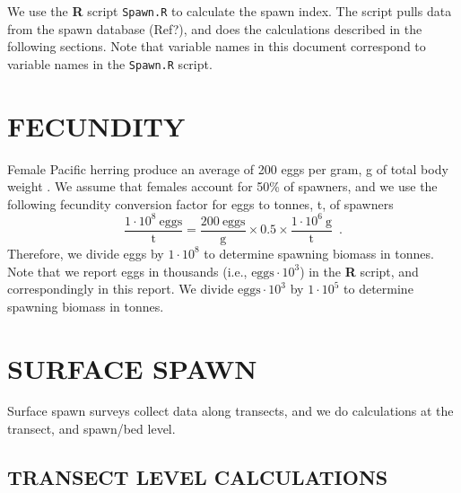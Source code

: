 \documentclass[12pt]{article}
\begin{document}
We use the \textbf{R} \citeyearpar[RCT][]{R-3.3.2} script \texttt{Spawn.R} to calculate the spawn index.
The script pulls data from the spawn database (Ref?), and does the calculations described in the following sections.
Note that variable names in this document correspond to variable names in the \texttt{Spawn.R} script.

\section{FECUNDITY}

Female Pacific herring produce an average of 200 eggs per gram, g of total body weight \citep{Hay1985}.
We assume that females account for 50\% of spawners, and we use the following fecundity conversion factor for eggs to tonnes, t, of spawners
\begin{equation}
\frac {1 \cdot 10^{8}~\text{eggs}} {\text{t}} = \frac{200~\text{eggs}} {\text{g}} \times 0.5 \times \frac{1 \cdot 10^{6}~\text{g}} {\text{t}} \enspace .
\label{eqFecundityConv}
\end{equation}
Therefore, we divide eggs by $1 \cdot 10^{8}$ to determine spawning biomass in tonnes.
Note that we report eggs in thousands (i.e., $\text{eggs} \cdot 10^{3}$) in the \textbf{R} script, and correspondingly in this report. 
We divide $\text{eggs} \cdot 10^{3}$ by $1 \cdot 10^{5}$ to determine spawning biomass in tonnes.

\section{SURFACE SPAWN}

Surface spawn surveys collect data along transects, and we do calculations at the transect, and spawn/bed level.

\subsection{TRANSECT LEVEL CALCULATIONS}
\end{document}
